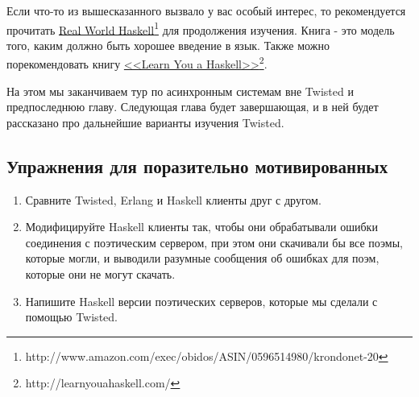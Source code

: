 Если что-то из вышесказанного вызвало у вас особый интерес, 
то рекомендуется прочитать  
\href{http://www.amazon.com/exec/obidos/ASIN/0596514980/krondonet-20}{Real World Haskell}\footnote[1]{http://www.amazon.com/exec/obidos/ASIN/0596514980/krondonet-20} 
для продолжения изучения. Книга - это модель того, каким должно 
быть хорошее введение в язык. Также можно порекомендовать книгу 
\href{http://learnyouahaskell.com/}{<<Learn You a Haskell>>}\footnote[2]{http://learnyouahaskell.com/}.  


На этом мы заканчиваем тур по асинхронным системам вне Twisted и предпоследнюю 
главу. Следующая глава будет завершающая, и в ней будет рассказано про 
дальнейшие варианты изучения Twisted. 


\subsection{Упражнения для поразительно мотивированных}

\begin{enumerate}

\item Сравните Twisted, Erlang и Haskell клиенты друг с другом.

\item Модифицируйте Haskell клиенты так, чтобы они обрабатывали 
ошибки соединения с поэтическим сервером, при этом они скачивали бы 
все поэмы, которые могли, и выводили разумные сообщения об ошибках для 
поэм, которые они не могут скачать.

\item Напишите Haskell версии поэтических серверов, которые 
мы сделали с помощью Twisted.

\end{enumerate}


